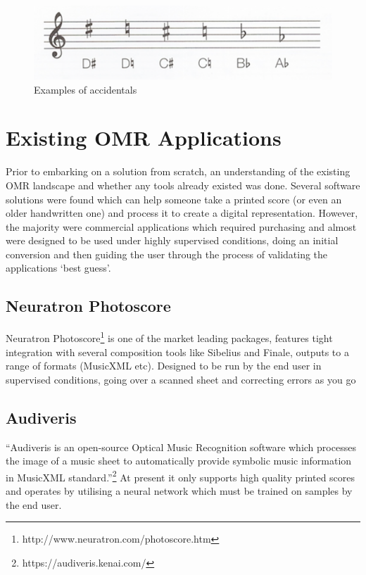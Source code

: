 \begin{figure}[h!]
  \includegraphics[width=\linewidth]{gfx/basic/accidentals.png}
  \centering
  \caption{Examples of accidentals}
  \label{fig:Accidentals}
\end{figure}



\section{Existing OMR Applications}

Prior to embarking on a solution from scratch, an understanding of the existing OMR landscape and whether any tools already existed was done. Several software solutions were found which can help someone take a printed score (or even an older handwritten one) and process it to create a digital representation. However, the majority were commercial applications which required purchasing and almost were designed to be used under highly supervised conditions, doing an initial conversion and then guiding the user through the process of validating the applications `best guess'.

\subsection{Neuratron Photoscore}
Neuratron Photoscore\footnote{http://www.neuratron.com/photoscore.htm} is one of the market leading packages, features tight integration with several composition tools like Sibelius and Finale, outputs to a range of formats (MusicXML etc). Designed to be run by the end user in supervised conditions, going over a scanned sheet and correcting errors as you go

\subsection{Audiveris}
``Audiveris is an open-source Optical Music Recognition software which processes the image of a music sheet to automatically provide symbolic music information in MusicXML standard.''\footnote{https://audiveris.kenai.com/}
\newline
At present it only supports high quality printed scores and operates by utilising a neural network which must be trained on samples by the end user.

